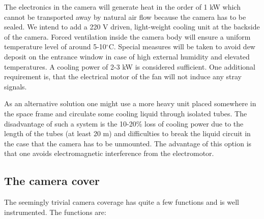 \medskip The electronics in the camera will generate heat in the order of 1
kW which cannot be transported away by natural air flow because the camera
has to be sealed. We intend to add a 220 V driven, light-weight cooling unit
at the backside of the camera. Forced ventilation inside the camera body
will ensure a uniform temperature level of around 5-10$^\circ$C. Special
measures will be taken to avoid dew deposit on the entrance window in case
of high external humidity and elevated temperatures. A cooling power of 2-3
kW is considered sufficient. One additional requirement is, that the
electrical motor of the fan will not induce any stray signals.

As an alternative solution one might use a more heavy unit placed somewhere
in the space frame and circulate some cooling liquid through isolated tubes.
The disadvantage of such a system is the 10-20\% loss of cooling power due
to the length of the tubes (at least 20 m) and difficulties to break the
liquid circuit in the case that the camera has to be unmounted. The
advantage of this option is that one avoids electromagnetic interference
from the electromotor.

\subsection{The camera cover}


\medskip The seemingly trivial camera coverage has quite a few functions and
is well instrumented. The functions are:

